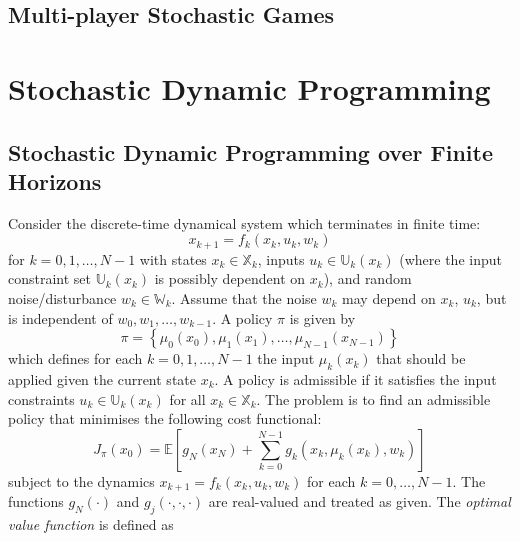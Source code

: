 \documentclass[11pt]{report} %
\begin{document}
\subsection{Multi-player Stochastic Games \cite{Neyman2003}}

\section{Stochastic Dynamic Programming \cite{Bertsekas1976}}

\subsection{Stochastic Dynamic Programming over Finite Horizons}

Consider the discrete-time dynamical system which terminates in finite time:
\begin{equation}
x_{k + 1} = f_{k}\left(x_{k}, u_{k}, w_{k}\right)
\end{equation}
for $k = 0, 1, \dots, N - 1$ with states $x_{k} \in \mathbb{X}_{k}$, inputs $u_{k} \in \mathbb{U}_{k}\left(x_{k}\right)$ (where the input constraint set $\mathbb{U}_{k}\left(x_{k}\right)$ is possibly dependent on $x_{k}$), and random noise/disturbance $w_{k} \in \mathbb{W}_{k}$. Assume that the noise $w_{k}$ may depend on $x_{k}$, $u_{k}$, but is independent of $w_{0}, w_{1}, \dots, w_{k - 1}$. A policy $\pi$ is given by
\begin{equation}
\pi = \left\{\mu_{0}\left(x_{0}\right), \mu_{1}\left(x_{1}\right), \dots, \mu_{N - 1}\left(x_{N - 1}\right)\right\}
\end{equation}
which defines for each $k = 0, 1, \dots, N - 1$ the input $\mu_{k}\left(x_{k}\right)$ that should be applied given the current state $x_{k}$. A policy is admissible if it satisfies the input constraints $u_{k} \in \mathbb{U}_{k}\left(x_{k}\right)$ for all $x_{k} \in \mathbb{X}_{k}$. The problem is to find an admissible policy that minimises the following cost functional:
\begin{equation}
J_{\pi}\left(x_{0}\right) = \mathbb{E}\left[g_{N}\left(x_{N}\right) + \sum_{k = 0}^{N - 1}g_{k}\left(x_{k}, \mu_{k}\left(x_{k}\right), w_{k}\right)\right]
\end{equation}
subject to the dynamics $x_{k + 1} = f_{k}\left(x_{k}, u_{k}, w_{k}\right)$ for each $k = 0, \dots, N - 1$. The functions $g_{N}\left(\cdot\right)$ and $g_{j}\left(\cdot, \cdot, \cdot\right)$ are real-valued and treated as given. The \textit{optimal value function} is defined as
\end{document}
